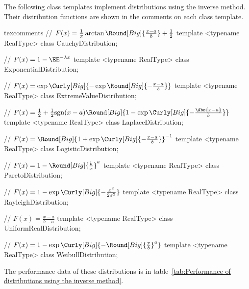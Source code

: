 The following class templates implement distributions using the inverse method.
Their distribution functions are shown in the comments on each class template.
\begin{cppcode*}{texcomments}
  // $F(x) = \frac{1}{\pi}\arctan\Round[Big]{\frac{x - a}{b}} + \frac{1}{2}$
  template <typename RealType>
  class CauchyDistribution;

  // $F(x) = 1 - \EE^{-\lambda x}$
  template <typename RealType>
  class ExponentialDistribution;

  // $F(x) = \exp\Curly[Big]{-\exp\Round[Big]{-\frac{x - a}{b}}}$
  template <typename RealType>
  class ExtremeValueDistribution;

  // $F(x) = \frac{1}{2} + \frac{1}{2}\mathrm{sgn}(x - a)\Round[Big]{1 - \exp\Curly[Big]{-\frac{\Abs{x - a}}{b}}}$
  template <typename RealType>
  class LaplaceDistribution;

  // $F(x) = \Round[Big]{1 + \exp\Curly[Big]{-\frac{x - a}{b}}}^{-1}$
  template <typename RealType>
  class LogisticDistribution;

  // $F(x) = 1 - \Round[Big]{\frac{b}{x}}^a$
  template <typename RealType>
  class ParetoDistribution;

  // $F(x) = 1 - \exp\Curly[Big]{-\frac{x^2}{2\sigma^2}}$
  template <typename RealType>
  class RayleighDistribution;

  // $F(x) = \frac{x - a}{b - a}$
  template <typename RealType>
  class UniformRealDistribution;

  // $F(x) = 1 - \exp\Curly[Big]{-\Round[Big]{\frac{x}{b}}^a}$
  template <typename RealType>
  class WeibullDistribution;
\end{cppcode*}
The performance data of these distributions is in table~\ref{tab:Performance of
  distributions using the inverse method}.

